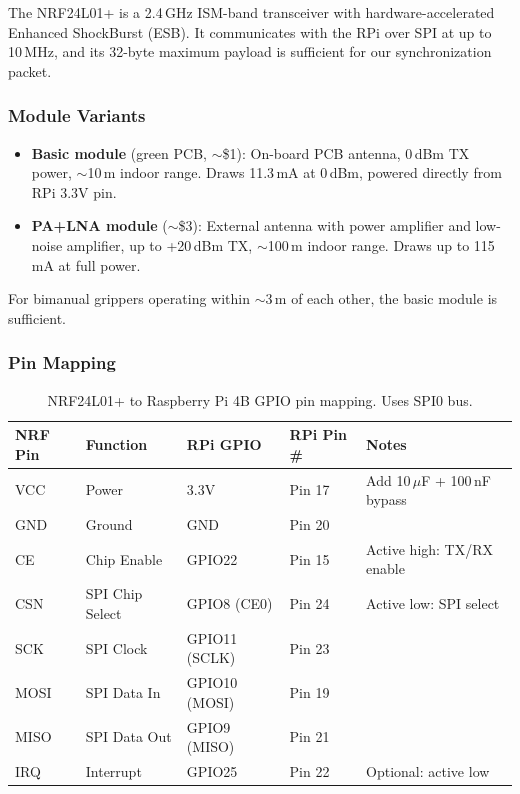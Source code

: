 \documentclass[11pt,a4paper]{article}
\begin{document}
The NRF24L01+ is a 2.4\,GHz ISM-band transceiver with hardware-accelerated Enhanced ShockBurst (ESB). It communicates with the RPi over SPI at up to 10\,MHz, and its 32-byte maximum payload is sufficient for our synchronization packet.

\subsubsection{Module Variants}

\begin{itemize}
  \item \textbf{Basic module} (green PCB, ${\sim}$\$1): On-board PCB antenna, 0\,dBm TX power, ${\sim}$10\,m indoor range. Draws 11.3\,mA at 0\,dBm, powered directly from RPi 3.3V pin.
  \item \textbf{PA+LNA module} (${\sim}$\$3): External antenna with power amplifier and low-noise amplifier, up to +20\,dBm TX, ${\sim}$100\,m indoor range. Draws up to 115\,mA at full power.
\end{itemize}

For bimanual grippers operating within ${\sim}$3\,m of each other, the basic module is sufficient.

\subsubsection{Pin Mapping}

\begin{table}[htbp]
\centering
\caption{NRF24L01+ to Raspberry Pi 4B GPIO pin mapping. Uses SPI0 bus.}
\begin{tabular}{l l l l l}
\toprule
\textbf{NRF Pin} & \textbf{Function} & \textbf{RPi GPIO} & \textbf{RPi Pin \#} & \textbf{Notes} \\
\midrule
VCC & Power & 3.3V & Pin 17 & Add 10\,$\mu$F + 100\,nF bypass \\
GND & Ground & GND & Pin 20 & \\
CE & Chip Enable & GPIO22 & Pin 15 & Active high: TX/RX enable \\
CSN & SPI Chip Select & GPIO8 (CE0) & Pin 24 & Active low: SPI select \\
SCK & SPI Clock & GPIO11 (SCLK) & Pin 23 & \\
MOSI & SPI Data In & GPIO10 (MOSI) & Pin 19 & \\
MISO & SPI Data Out & GPIO9 (MISO) & Pin 21 & \\
IRQ & Interrupt & GPIO25 & Pin 22 & Optional: active low \\
\bottomrule
\end{tabular}
\label{tab:nrf-pins}
\end{table}
\end{document}
